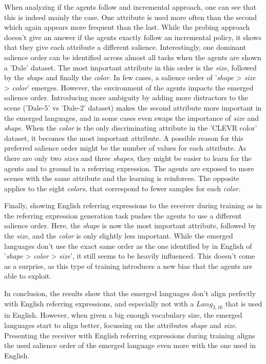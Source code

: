 When analyzing if the agents follow and incremental approach, one can see that this is indeed mainly the case.
One attribute is used more often than the second which again appears more frequent than the last.
While the probing approach doesn't give an answer if the agents exactly follow an incremental policy, it shows that they give each attribute a different salience.
Interestingly, one dominant salience order can be identified across almost all tasks when the agents are shown a 'Dale' dataset.
The most important attribute in this order is the \emph{size}, followed by the \emph{shape} and finally the \emph{color}.
In few cases, a salience order of '\emph{shape} > \emph{size} > \emph{color}' emerges.
However, the environment of the agents impacts the emerged salience order.
Introducing more ambiguity by adding more distractors to the scene ('Dale-5' vs 'Dale-2' dataset) makes the second attribute more important in the emerged languages, and in some cases even swaps the importance of \emph{size} and \emph{shape}.
When the \emph{color} is the only discriminating attribute in the 'CLEVR color' dataset, it becomes the most important attribute.
A possible reason for this preferred salience order might be the number of values for each attribute.
As there are only two \emph{sizes} and three \emph{shapes}, they might be easier to learn for the agents and to ground in a referring expression.
The agents are exposed to more scenes with the same attribute and the learning is reinforces.
The opposite applies to the eight \emph{colors}, that correspond to fewer samples for each \emph{color}.

Finally, showing English referring expressions to the receiver during training as in the referring expression generation task pushes the agents to use a different salience order.
Here, the \emph{shape} is now the most important attribute, followed by the \emph{size}, and the \emph{color} is only slightly less important.
While the emerged languages don't use the exact same order as the one identified by \citet{Dale1995} in English of '\emph{shape} > \emph{color} > \emph{size}', it still seems to be heavily influenced.
This doesn't come as a surprise, as this type of training introduces a new bias that the agents are able to exploit.

In conclusion, the results show that the emerged languages don't align perfectly with English referring expressions, and especially not with a $Lang_{3,16}$ that is used in English.
However, when given a big enough vocabulary size, the emerged languages start to align better, focussing on the attributes \emph{shape} and \emph{size}.
Presenting the receiver with English referring expressions during training aligns the used salience order of the emerged language even more with the one used in English.

